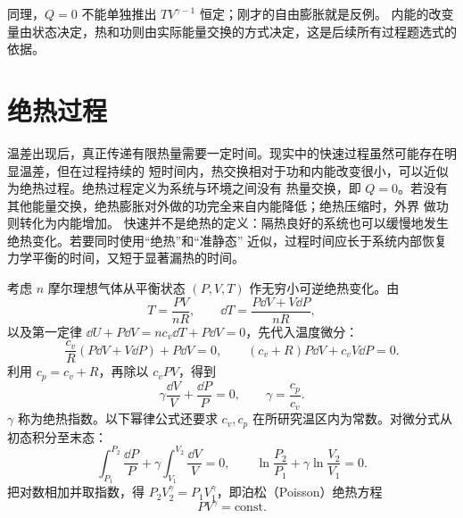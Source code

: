 {同理，$Q=0$ 不能单独推出 $TV^{\gamma-1}$ 恒定；刚才的自由膨胀就是反例。
内能的改变量由状态决定，热和功则由实际能量交换的方式决定，这是后续所有过程题选式的依据。

\section{绝热过程}

温差出现后，真正传递有限热量需要一定时间。现实中的快速过程虽然可能存在明显温差，但在过程持续的
短时间内，热交换相对于功和内能改变很小，可以近似为绝热过程。绝热过程定义为系统与环境之间没有
热量交换，即 $Q=0$。若没有其他能量交换，绝热膨胀对外做的功完全来自内能降低；绝热压缩时，外界
做功则转化为内能增加。
快速并不是绝热的定义：隔热良好的系统也可以缓慢地发生绝热变化。若要同时使用“绝热”和“准静态”
近似，过程时间应长于系统内部恢复力学平衡的时间，又短于显著漏热的时间。

考虑 $n$ 摩尔理想气体从平衡状态 $(P,V,T)$ 作无穷小可逆绝热变化。由
\begin{equation*}
  T=\frac{PV}{nR},
  \qquad
  \dd T=\frac{P\dd V+V\dd P}{nR},
\end{equation*}
以及第一定律 $\dd U+P\dd V=n c_v\dd T+P\dd V=0$，先代入温度微分：
\[
 \frac{c_v}{R}(P\dd V+V\dd P)+P\dd V=0,
 \qquad (c_v+R)P\dd V+c_v V\dd P=0.
\]
利用 $c_p=c_v+R$，再除以 $c_vPV$，得到
\begin{equation}
  \boxed{\gamma\frac{\dd V}{V}+\frac{\dd P}{P}=0},
  \qquad
  \boxed{\gamma=\frac{c_p}{c_v}}. \label{ch15:eq:s29-20-6}
\end{equation}
$\gamma$ 称为绝热指数。以下幂律公式还要求 $c_v,c_p$ 在所研究温区内为常数。对微分式从初态积分至末态：
\[
 \int_{P_1}^{P_2}\frac{\dd P}{P}+\gamma\int_{V_1}^{V_2}\frac{\dd V}{V}=0,
 \qquad \ln\frac{P_2}{P_1}+\gamma\ln\frac{V_2}{V_1}=0.
\]
把对数相加并取指数，得 $P_2V_2^\gamma=P_1V_1^\gamma$，即泊松（Poisson）绝热方程
\begin{equation}
  \boxed{PV^\gamma=\mathrm{const}}. \label{ch15:eq:s29-20-7}
\end{equation}

}

